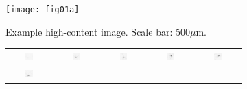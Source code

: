 \begin{figure}%
	\centering
	\begin{subfigure}{\textwidth}
		\centering
		\texttt{[image: fig01a]}
		\vspace{-0.5em}
		\caption{Example high-content image. Scale bar: 500$\mu$m.}
		\vspace{1em}
	\end{subfigure}
	\begin{subfigure}{0.45\textwidth}
		\centering
		\begin{tabular}{c@{\,}c@{\,}c@{\,}c@{\,}c@{}}
			\includegraphics[width=0.19\textwidth]{fig01b01} &
			\includegraphics[width=0.19\textwidth]{fig01b02} &
			\includegraphics[width=0.19\textwidth]{fig01b03} &
			\includegraphics[width=0.19\textwidth]{fig01b04} &
			\includegraphics[width=0.19\textwidth]{fig01b05} \\
			\includegraphics[width=0.19\textwidth]{fig01b06} &

\end{tabular}
\end{subfigure}
\end{figure}
